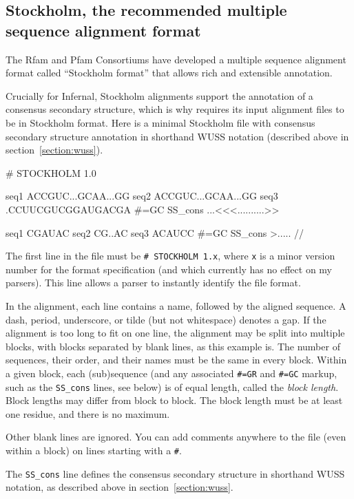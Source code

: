 \subsection{Stockholm, the recommended multiple sequence alignment format}
\label{section:stockholm}

The Rfam and Pfam Consortiums have developed a multiple sequence
alignment format called ``Stockholm format'' that allows rich and
extensible annotation. 

Crucially for Infernal, Stockholm alignments support the annotation of 
a consensus secondary structure, which is why  requires
its input alignment files to be in Stockholm format. Here is a minimal
Stockholm file with consensus secondary structure annotation in
shorthand WUSS notation (described above in
section~\ref{section:wuss}).

\begin{sreoutput}
# STOCKHOLM 1.0

seq1           ACCGUC...GCAA...GG
seq2           ACCGUC...GCAA...GG
seq3           .CCUUCGUCGGAUGACGA
#=GC SS_cons   ...<<<..........>>

seq1           CGAUAC
seq2           CG..AC
seq3           ACAUCC
#=GC SS_cons   >.....
//
\end{sreoutput}

The first line in the file must be \verb+# STOCKHOLM 1.x+, where
\verb+x+ is a minor version number for the format specification
(and which currently has no effect on my parsers). This line allows a
parser to instantly identify the file format.

In the alignment, each line contains a name, followed by the aligned
sequence. A dash, period, underscore, or tilde (but not whitespace)
denotes a gap. If the alignment is too long to fit on one line, the
alignment may be split into multiple blocks, with blocks separated by
blank lines, as this example is. The number of sequences, their order,
and their names must be the same in every block. Within a given block,
each (sub)sequence (and any associated \verb+#=GR+ and \verb+#=GC+
markup, such as the \verb+SS_cons+ lines, see below) is of equal
length, called the \textit{block length}. Block lengths may differ
from block to block. The block length must be at least one residue,
and there is no maximum. 

Other blank lines are ignored. You can add comments anywhere to the
file (even within a block) on lines starting with a \verb+#+.

The \verb+SS_cons+ line defines the consensus secondary structure in
shorthand WUSS notation, as described above in
section~\ref{section:wuss}.

